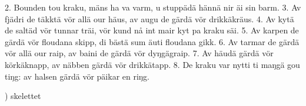 2.  Bounden tou kraku, mäns ha va varm,
    u stuppädä hännä nir äi sin barm.
3.  Av fjädri de täkktä vör allä our häus,
    av augu de gärdä vör drikkäkräus.
4.  Av kytä de saltäd vör tunnar träi,
    vör kund nå int mair kyt pa kraku säi.
5.  Av karpen de gärdä vör floudana skipp,
    di bästä sum äuti floudana gikk.
6.  Av tarmar de gärdä vör allä our raip,
    av baini de gärdä vör dyŋgägraip.
7.  Av häudä gärdä vör körkäknapp,
    av näbben gärdä vör drikkätapp.
8.  De kraku var nytti ti maŋgä gou tiŋg:
    av halsen gärdä vör päikar en riŋg.
    
\vspace{5mm}
\tabto{0.2cm}) skelettet
